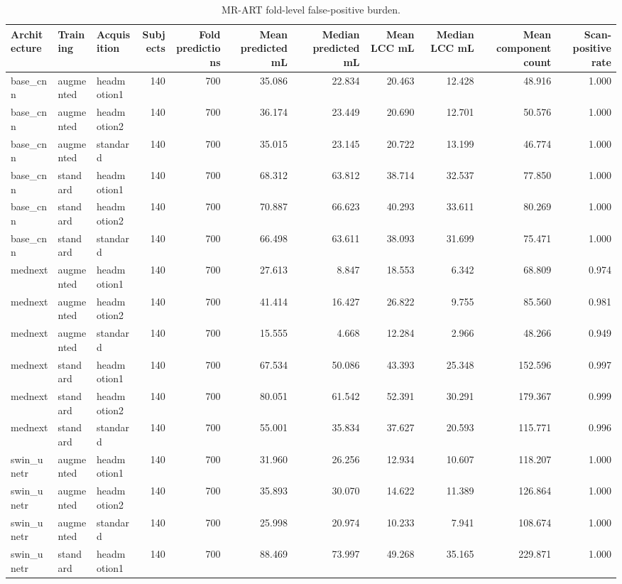 \begin{table}
\caption{MR-ART fold-level false-positive burden.}
\label{tab:mrart_burden}
\begin{tabular}{lllrrrrrrrr}
\toprule
Architecture & Training & Acquisition & Subjects & Fold predictions & Mean predicted mL & Median predicted mL & Mean LCC mL & Median LCC mL & Mean component count & Scan-positive rate \\
\midrule
base\_cnn & augmented & headmotion1 & 140 & 700 & 35.086 & 22.834 & 20.463 & 12.428 & 48.916 & 1.000 \\
base\_cnn & augmented & headmotion2 & 140 & 700 & 36.174 & 23.449 & 20.690 & 12.701 & 50.576 & 1.000 \\
base\_cnn & augmented & standard & 140 & 700 & 35.015 & 23.145 & 20.722 & 13.199 & 46.774 & 1.000 \\
base\_cnn & standard & headmotion1 & 140 & 700 & 68.312 & 63.812 & 38.714 & 32.537 & 77.850 & 1.000 \\
base\_cnn & standard & headmotion2 & 140 & 700 & 70.887 & 66.623 & 40.293 & 33.611 & 80.269 & 1.000 \\
base\_cnn & standard & standard & 140 & 700 & 66.498 & 63.611 & 38.093 & 31.699 & 75.471 & 1.000 \\
mednext & augmented & headmotion1 & 140 & 700 & 27.613 & 8.847 & 18.553 & 6.342 & 68.809 & 0.974 \\
mednext & augmented & headmotion2 & 140 & 700 & 41.414 & 16.427 & 26.822 & 9.755 & 85.560 & 0.981 \\
mednext & augmented & standard & 140 & 700 & 15.555 & 4.668 & 12.284 & 2.966 & 48.266 & 0.949 \\
mednext & standard & headmotion1 & 140 & 700 & 67.534 & 50.086 & 43.393 & 25.348 & 152.596 & 0.997 \\
mednext & standard & headmotion2 & 140 & 700 & 80.051 & 61.542 & 52.391 & 30.291 & 179.367 & 0.999 \\
mednext & standard & standard & 140 & 700 & 55.001 & 35.834 & 37.627 & 20.593 & 115.771 & 0.996 \\
swin\_unetr & augmented & headmotion1 & 140 & 700 & 31.960 & 26.256 & 12.934 & 10.607 & 118.207 & 1.000 \\
swin\_unetr & augmented & headmotion2 & 140 & 700 & 35.893 & 30.070 & 14.622 & 11.389 & 126.864 & 1.000 \\
swin\_unetr & augmented & standard & 140 & 700 & 25.998 & 20.974 & 10.233 & 7.941 & 108.674 & 1.000 \\
swin\_unetr & standard & headmotion1 & 140 & 700 & 88.469 & 73.997 & 49.268 & 35.165 & 229.871 & 1.000 \\

\end{tabular}
\end{table}
